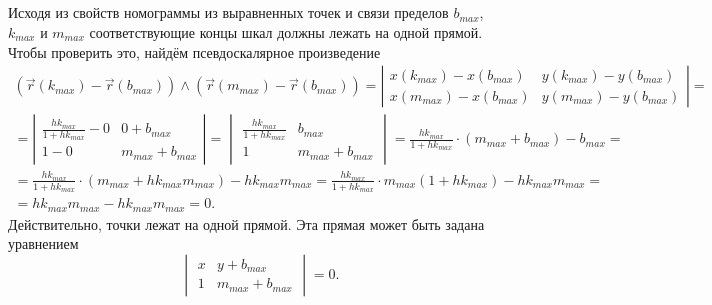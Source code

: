 \subparagraph{}Исходя из свойств номограммы из выравненных точек и связи пределов $b_{max}$, $k_{max}$ и $m_{max}$ соответствующие концы шкал должны лежать на одной прямой.
Чтобы проверить это, найдём псевдоскалярное произведение
$$
\begin{gathered}
	\left(\vec{r}(k_{max}) - \vec{r}(b_{max}) \right) \wedge \left(\vec{r}(m_{max}) - \vec{r}(b_{max}) \right)
	=
	\left|
		\begin{array}{cc}
			x(k_{max}) - x(b_{max}) & y(k_{max}) - y(b_{max}) \\
			x(m_{max}) - x(b_{max}) & y(m_{max}) - y(b_{max})
		\end{array}
	\right|
	= \\
	=
	\left|
		\begin{array}{cc}
			\frac{h k_{max}}{1+h k_{max}} - 0 & 0 + b_{max} \\
			1 - 0 & m_{max} + b_{max}
		\end{array}
	\right|
	= 
	\begin{vmatrix}
		\frac{h k_{max}}{1+h k_{max}} & b_{max} \\
		1 & m_{max} + b_{max}
	\end{vmatrix}
	= \frac{h k_{max}}{1+h k_{max}} \cdot \left(m_{max} + b_{max} \right) - b_{max} 
	= \\
	= \frac{h k_{max}}{1+h k_{max}} \cdot \left(m_{max} + h k_{max} m_{max}\right) - h k_{max} m_{max}
	= \frac{h k_{max}}{1+h k_{max}} \cdot m_{max} \left(1 + h k_{max}\right) - h k_{max} m_{max}
	= \\
	= h k_{max} m_{max}  - h k_{max} m_{max} = 0.
\end{gathered}
$$
Действительно, точки лежат на одной прямой.
Эта прямая может быть задана уравнением
$$
\begin{vmatrix}
	x & y + b_{max} \\
	1 & m_{max} + b_{max}
\end{vmatrix}
=0.
$$